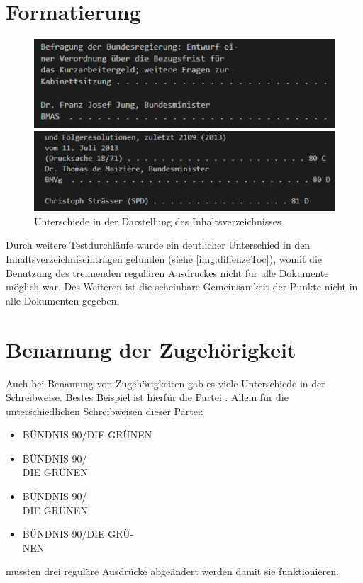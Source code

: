 \section{Formatierung}
\begin{figure}[h]
	\begin{minipage}{.49\linewidth}
		\includegraphics[width=\linewidth]{img/toc17.pdf}
	\end{minipage}\hfill
	\begin{minipage}{.49\linewidth}
		\includegraphics[width=\linewidth]{img/toc18.pdf}
	\end{minipage}
	\caption{Unterschiede in der Darstellung des Inhaltsverzeichnisses}
	\label{img:diffenzeToc}
\end{figure}

\noindent
Durch weitere Testdurchläufe wurde ein deutlicher Unterschied in den Inhaltsverzeichniseinträgen gefunden (siehe \autoref{img:diffenzeToc}), womit die Benutzung des trennenden regulären Ausdruckes nicht für alle Dokumente möglich war.  Des Weiteren ist die scheinbare Gemeinsamkeit der Punkte nicht in alle Dokumenten gegeben.\\

\newpage
\section{Benamung der Zugehörigkeit}
Auch bei Benamung von Zugehörigkeiten gab es viele Unterschiede in der Schreibweise. Bestes Beispiel ist hierfür die Partei . Allein für die unterschiedlichen Schreibweisen dieser Partei:
\begin{multicols}{2}
	\begin{itemize}
		\item BÜNDNIS 90/DIE GRÜNEN
		\item BÜNDNIS 90/\\
		DIE GRÜNEN
		\columnbreak
		\item BÜNDNIS 90/\\
		
		DIE GRÜNEN
		\item BÜNDNIS 90/DIE GRÜ-\\
		NEN	
	\end{itemize}
\end{multicols}
mussten drei reguläre Ausdrücke abgeändert werden damit sie funktionieren.

